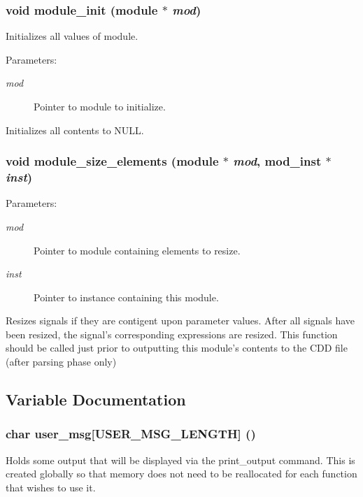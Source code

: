 \subsubsection{\setlength{\rightskip}{0pt plus 5cm}void module\_\-init ({\bf module} $\ast$ {\em mod})}\label{module_8c_a1}


Initializes all values of module.

\begin{Desc}
\item[Parameters:]
\begin{description}
\item[{\em mod}]Pointer to module to initialize.\end{description}
\end{Desc}
Initializes all contents to NULL. 
\subsubsection{\setlength{\rightskip}{0pt plus 5cm}void module\_\-size\_\-elements ({\bf module} $\ast$ {\em mod}, {\bf mod\_\-inst} $\ast$ {\em inst})}\label{module_8c_a3}


\begin{Desc}
\item[Parameters:]
\begin{description}
\item[{\em mod}]Pointer to module containing elements to resize. \item[{\em inst}]Pointer to instance containing this module.\end{description}
\end{Desc}
Resizes signals if they are contigent upon parameter values. After all signals have been resized, the signal's corresponding expressions are resized. This function should be called just prior to outputting this module's contents to the CDD file (after parsing phase only) 

\subsection{Variable Documentation}
\subsubsection{\setlength{\rightskip}{0pt plus 5cm}char user\_\-msg[USER\_\-MSG\_\-LENGTH] ()}\label{module_8c_a0}


Holds some output that will be displayed via the print\_\-output command. This is created globally so that memory does not need to be reallocated for each function that wishes to use it. 